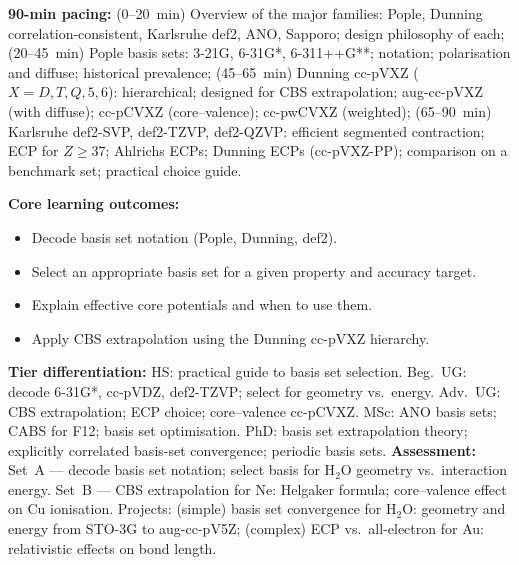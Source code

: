 \documentclass[11pt,a4paper]{article}
\begin{document}
\begin{tcolorbox}[chembox, title={Module~III.2 --- Lecture L14: Basis Sets II --- Standard Basis Families}]
\textbf{90-min pacing:} (0--20~min) Overview of the major families: Pople, Dunning correlation-consistent, Karlsruhe def2, ANO, Sapporo; design philosophy of each; (20--45~min) Pople basis sets: 3-21G, 6-31G*, 6-311++G**; notation; polarisation and diffuse; historical prevalence; (45--65~min) Dunning cc-pVXZ ($X=D,T,Q,5,6$): hierarchical; designed for CBS extrapolation; aug-cc-pVXZ (with diffuse); cc-pCVXZ (core--valence); cc-pwCVXZ (weighted); (65--90~min) Karlsruhe def2-SVP, def2-TZVP, def2-QZVP: efficient segmented contraction; ECP for $Z\geq37$; Ahlrichs ECPs; Dunning ECPs (cc-pVXZ-PP); comparison on a benchmark set; practical choice guide.

\medskip\textbf{Core learning outcomes:}
\begin{itemize}[leftmargin=1.4em,topsep=2pt,itemsep=1pt]
  \item Decode basis set notation (Pople, Dunning, def2).
  \item Select an appropriate basis set for a given property and accuracy target.
  \item Explain effective core potentials and when to use them.
  \item Apply CBS extrapolation using the Dunning cc-pVXZ hierarchy.
\end{itemize}
\medskip\textbf{Tier differentiation:}
HS: practical guide to basis set selection.
Beg.\ UG: decode 6-31G*, cc-pVDZ, def2-TZVP; select for geometry vs.\ energy.
Adv.\ UG: CBS extrapolation; ECP choice; core--valence cc-pCVXZ.
MSc: ANO basis sets; CABS for F12; basis set optimisation.
PhD: basis set extrapolation theory; explicitly correlated basis-set convergence; periodic basis sets.
\medskip\textbf{Assessment:}
Set~A --- decode basis set notation; select basis for H$_2$O geometry vs.\ interaction energy.
Set~B --- CBS extrapolation for Ne: Helgaker formula; core--valence effect on Cu ionisation.
Projects: (simple) basis set convergence for H$_2$O: geometry and energy from STO-3G to aug-cc-pV5Z; (complex) ECP vs.\ all-electron for Au: relativistic effects on bond length.
\end{tcolorbox}

\medskip
\end{document}
